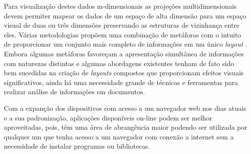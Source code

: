 Para visualização destes dados m-dimensionais as projeções multidimensionais devem permiter mapear os dados de um espaço de alta dimensão para um espaço visual de duas ou três dimensões preservando as estruturas de vizinhança entre eles. Várias metodologias propõem uma combinação de metáforas com o intuito de proporcionar um conjunto mais completo de informações em um único \textit{layout} \cite{pagliosa2013mist}.
 Embora algumas metáforas favoreçam a apresentação simultânea de informações com naturezas distintas e algumas abordagens existentes tenham de fato sido bem sucedidas na criação de \emph{layouts} compostos que proporcionam efeitos visuais significativos, ainda há uma necessidade grande de técnicas e ferramentas para realizar análise de informações em documentos.


  


 
Com a expanção dos dispositivos com acesso a um navegador web nos dias atuais e a sua padronização, aplicações disponíveis on-line podem ser melhor aproveitadas, pois, têm uma área de abrangência maior podendo ser utilizada por qualquer um que tenha acesso a um navegador com conexão a internet sem a necessidade de instalar programas ou bibliotecas.
 

